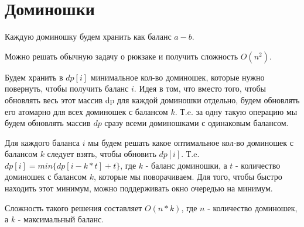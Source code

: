 \documentclass[a4paper,12pt]{article}
\begin{document}
\section{Доминошки}

Каждую доминошку будем хранить как баланс $a-b$.

Можно решать обычную задачу о рюкзаке и получить сложность $O(n^2)$.

Будем хранить в $dp[i]$ минимальное кол-во доминошек, которые нужно повернуть, чтобы получить баланс $i$. Идея в том, что вместо того, чтобы обновлять весь этот массив dp для каждой доминошки отдельно, будем обновлять его атомарно для всех доминошек с балансом $k$. Т.e. за одну такую операцию мы будем обновлять массив $dp$ сразу всеми доминошками с одинаковым балансом. 

Для каждого баланса $i$ мы будем решать какое оптимальное кол-во доминошек с балансом $k$ следует взять, чтобы обновить $dp[i]$. Т.e. $dp[i]=min\{dp[i-k*t] + t\}$, где $k$ - баланс доминошки, а $t$ - количество доминошек с балансом $k$, которые мы поворачиваем. Для того, чтобы быстро находить этот минимум, можно поддерживать окно очередью на минимум.

Сложность такого решения составляет $O(n*k)$, где $n$ - количество доминошек, а $k$ - максимальный баланс.
\end{document}
